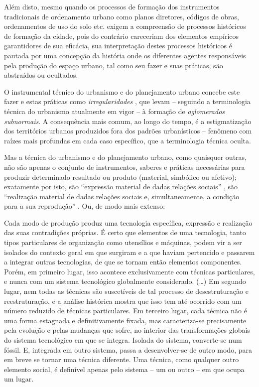 Além disto, mesmo quando os processos de formação dos instrumentos tradicionais de ordenamento urbano como planos diretores, códigos de obras, ordenamentos de uso do solo etc. exigem a compreensão de processos históricos de formação da cidade, pois do contrário careceriam dos elementos empíricos garantidores de sua eficácia, sua interpretação destes processos históricos é pautada por uma concepção da história onde os diferentes agentes responsáveis pela produção do espaço urbano, tal como seu fazer e suas práticas, são abstraídos ou ocultados. 

O instrumental técnico do urbanismo e do planejamento urbano concebe este fazer e estas práticas como \textit{irregularidades} \cite[p.~181-210]{ROLNIK2007}, que levam – seguindo a terminologia técnica do urbanismo atualmente em vigor – à formação de \textit{aglomerados subnormais}. A consequência mais comum, ao longo do tempo, é a estigmatização dos territórios urbanos produzidos fora dos padrões urbanísticos – fenômeno com raízes mais profundas em cada caso específico, que a terminologia técnica oculta.

Mas a técnica do urbanismo e do planejamento urbano, como quaisquer outras, não são apenas o conjunto de instrumentos, saberes e práticas necessárias para produzir determinado resultado ou produto (material, simbólico ou afetivo); exatamente por isto, são ``expressão material de dadas relações sociais'' \cite[p.~266]{BERNARDO1977c}, são ``realização material de dadas relações sociais e, simultaneamente, a condição para a sua reprodução'' \cite[p.~285]{BERNARDO1977c}. Ou, de modo mais extenso:

\begin{citacao}
Cada modo de produção produz uma tecnologia específica, expressão e realização das suas contradições próprias. É certo que elementos de uma tecnologia, tanto tipos particulares de organização como utensílios e máquinas, podem vir a ser isolados do contexto geral em que surgiram e a que haviam pertencido e passarem a integrar outras tecnologias, de que se tornam então elementos componentes. Porém, em primeiro lugar, isso acontece exclusivamente com técnicas particulares, e nunca com um sistema tecnológico globalmente considerado. (…) Em segundo lugar, nem todas as técnicas são suscetíveis de tal processo de desestruturação e reestruturação, e a análise histórica mostra que isso tem até ocorrido com um número reduzido de técnicas particulares. Em terceiro lugar, cada técnica não é uma forma estagnada e definitivamente fixada, mas caracteriza-se precisamente pela evolução e pelas mudanças que sofre, no interior das transformações globais do sistema tecnológico em que se integra. Isolada do sistema, converte-se num fóssil. E, integrada em outro sistema, passa a desenvolver-se de outro modo, para em breve se tornar uma técnica diferente. Uma técnica, como qualquer outro elemento social, é definível apenas pelo sistema – um ou outro – em que ocupa um lugar. \cite[p.~312]{BERNARDO1991}
\end{citacao}

